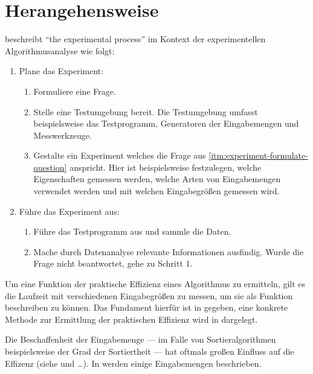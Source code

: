 \chapter{Herangehensweise}

\cite[10]{mcg2012} beschreibt \enquote{the experimental process} im Kontext der experimentellen Algorithmusanalyse wie folgt:
\begin{enumerate}
    \item Plane das Experiment:
    \begin{enumerate}[label={(\alph*)}]
        \item Formuliere eine Frage.\label{itm:experiment-formulate-question}
        \item Stelle eine Testumgebung bereit. Die Testumgebung umfasst beispielsweise das Testprogramm, Generatoren der Eingabemengen und Messwerkzeuge.
        \item Gestalte ein Experiment welches die Frage aus \ref{itm:experiment-formulate-question} anspricht. Hier ist beispielsweise festzulegen, welche Eigenschaften gemessen werden, welche Arten von Eingabemengen verwendet werden und mit welchen Eingabegrößen gemessen wird.
    \end{enumerate}
    
    \item Führe das Experiment aus:
    \begin{enumerate}[label={\alph*}]
        \item Führe das Testprogramm aus und sammle die Daten.
        \item Mache durch Datenanalyse relevante Informationen ausfindig. Wurde die Frage nicht beantwortet, gehe zu Schritt 1.
    \end{enumerate}
\end{enumerate}

Um eine Funktion der  praktische Effizienz eines Algorithmus zu ermitteln, gilt es die Laufzeit mit verschiedenen Eingabegrößen zu messen, um sie als Funktion beschreiben zu können. Das Fundament hierfür ist in  gegeben, eine konkrete Methode zur Ermittlung der praktischen Effizienz wird in  dargelegt.

Die Beschaffenheit der Eingabemenge --- im Falle von Sortieralgorithmen beispielsweise der Grad der Sortiertheit --- hat oftmals großen Einfluss auf die Effizenz (siehe  und \ldots\nocit). In  werden einige Eingabemengen beschrieben.

